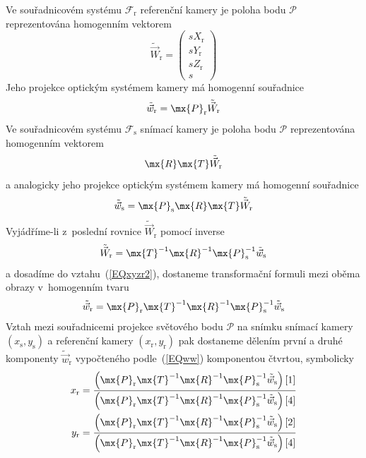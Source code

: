 Ve  souřadnicovém systému $\mathcal{F}_{\mathrm{r}}$ referenční
kamery je poloha bodu $\mathcal{P}$ reprezentována homogenním vektorem
\begin{equation} \label{EQXYZr}
  \tilde{\vec{W}}_{\mathrm{r}} =
  \begin{pmatrix}
    sX_{\mathrm{r}}\\sY_{\mathrm{r}}\\sZ_{\mathrm{r}}\\s
  \end{pmatrix}
\end{equation}
Jeho projekce optickým systémem kamery má homogenní souřadnice
\begin{equation} \label{EQxyzr2}
  \tilde{\vec{w}}_{\mathrm{r}} = \mx{P}_{\mathrm{r}} \tilde{\vec{W}}_{\mathrm{r}}
\end{equation}
Ve  souřadnicovém systému $\mathcal{F}_{\mathrm{s}}$ snímací
kamery je poloha bodu $\mathcal{P}$ reprezentována homogenním vektorem
\begin{equation} \label{EQrtW}
  \mx{R}\mx{T}\tilde{\vec{W}}_{\mathrm{r}}
\end{equation}
a analogicky jeho projekce optickým systémem kamery má homogenní souřadnice
\begin{equation} \label{EQwrtW}
  \tilde{\vec{w}}_{\mathrm{s}}
    = \mx{P}_{\mathrm{s}}\mx{R}\mx{T}\tilde{\vec{W}}_{\mathrm{r}}
\end{equation}
Vyjádříme-li z~poslední rovnice $\tilde{\vec{W}}_{\mathrm{r}}$ pomocí inverse
\begin{equation} \label{EQirtW}
  \tilde{\vec{W}}_{\mathrm{r}}
    = \mx{T}^{-1}\mx{R}^{-1}\mx{P}_{\mathrm{s}}^{-1}\tilde{\vec{w}}_{\mathrm{s}}
\end{equation}
a dosadíme do vztahu~(\ref{EQxyzr2}), dostaneme transformační formuli mezi
oběma obrazy v~homogenním tvaru
\begin{equation} \label{EQww}
  \tilde{\vec{w}}_{\mathrm{r}}
    = \mx{P}_{\mathrm{r}}
      \mx{T}^{-1}\mx{R}^{-1}\mx{P}_{\mathrm{s}}^{-1}\tilde{\vec{w}}_{\mathrm{s}}
\end{equation}
Vztah mezi souřadnicemi projekce světového bodu $\mathcal{P}$ na snímku
snímací kamery $(x_{\mathrm{s}},y_{\mathrm{s}})$ a referenční kamery
$(x_{\mathrm{r}},y_{\mathrm{r}})$ pak dostaneme dělením první a druhé
komponenty $\tilde{\vec{w}}_{\mathrm{r}}$ vypočteného podle~(\ref{EQww})
komponentou čtvrtou, symbolicky
\begin{subequations}\label{EQxryr}
  \begin{align}
  x_{\mathrm{r}}
  = \frac{\left(
        \mx{P}_{\mathrm{r}}\mx{T}^{-1}\mx{R}^{-1}\mx{P}_{\mathrm{s}}^{-1}
        \tilde{\vec{w}}_{\mathrm{s}}
      \right)[1]}%
         {\left(
        \mx{P}_{\mathrm{r}}\mx{T}^{-1}\mx{R}^{-1}\mx{P}_{\mathrm{s}}^{-1}
        \tilde{\vec{w}}_{\mathrm{s}}
      \right)[4]}\\
  y_{\mathrm{r}}
  = \frac{\left(
        \mx{P}_{\mathrm{r}}\mx{T}^{-1}\mx{R}^{-1}\mx{P}_{\mathrm{s}}^{-1}
        \tilde{\vec{w}}_{\mathrm{s}}
      \right)[2]}%
         {\left(
        \mx{P}_{\mathrm{r}}\mx{T}^{-1}\mx{R}^{-1}\mx{P}_{\mathrm{s}}^{-1}
        \tilde{\vec{w}}_{\mathrm{s}}
      \right)[4]}
  \end{align}
\end{subequations}
